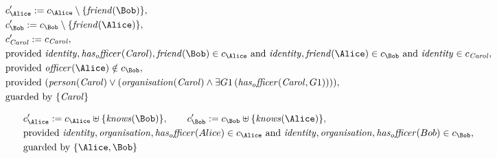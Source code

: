 \begin{align*}
&
c'_
{
\Alice
}
 := 
c_
{
\Alice
}
 \setminus 
\{
\mathit{
friend
}
(
\Bob
)
\}
,\\
&
c'_
{
\Bob
}
 := 
c_
{
\Bob
}
 \setminus 
\{
\mathit{
friend
}
(
\Alice
)
\}
,\\
&
c'_
{
\mathit{Carol}
}
 := 
c_
{
\mathit{Carol}
}
,\\
&
\text{provided } 
\mathit{
identity
}
,
\mathit{
has_officer
}
(
\mathit{Carol}
)
,
\mathit{
friend
}
(
\Bob
)
 \in c_
{
\Alice
}
 \text{ and } 
\mathit{
identity
}
,
\mathit{
friend
}
(
\Alice
)
 \in c_
{
\Bob
}
 \text{ and } 
\mathit{
identity
}
 \in c_
{
\mathit{Carol}
}
,\\
&
\text{provided } 
\mathit{
officer
}
(
\Alice
)
 \notin c_
{
\Bob
}
,\\
&
\text{provided } 
(
\mathit{
person
}
(
\mathit{Carol}
)
\lor
(
\mathit{
organisation
}
(
\mathit{Carol}
)
\land
\exists 
G1
\,(
\mathit{
has_officer
}
(
\mathit{Carol}
,
G1
)
)
)
)
,\\
&
\text{guarded by } \{
\mathit{Carol}
\}
\end{align*}

\begin{align*}
&
c'_
{
\Alice
}
 := 
c_
{
\Alice
}
 \uplus 
\{
\mathit{
knows
}
(
\Bob
)
\}
, \qquad 
c'_
{
\Bob
}
 := 
c_
{
\Bob
}
 \uplus 
\{
\mathit{
knows
}
(
\Alice
)
\}
,\\
&
\text{provided } 
\mathit{
identity
}
,
\mathit{
organisation
}
,
\mathit{
has_officer
}
(
Alice
)
 \in c_
{
\Alice
}
 \text{ and } 
\mathit{
identity
}
,
\mathit{
organisation
}
,
\mathit{
has_officer
}
(
Bob
)
 \in c_
{
\Bob
}
,\\
&
\text{guarded by } \{
\Alice
,
\Bob
\}
\end{align*}


